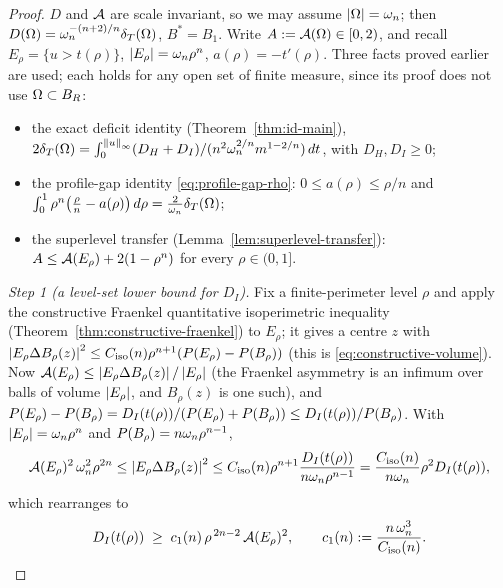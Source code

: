 \begin{proof}
$D$ and $\mathcal A$ are scale invariant, so we may assume $\left|\Omega\right|=\omega_n$; then
$D(\Omega)=\omega_n^{-(n+2)/n}\delta_T(\Omega)$, $B^*=B_1$. Write $A:=\mathcal A(\Omega)\in[0,2)$,
and recall $E_\rho=\{u>t(\rho)\}$, $\left|E_\rho\right|=\omega_n\rho^n$,
$a(\rho)=-t'(\rho)$. Three facts proved earlier are used; each holds for any
open set of finite measure, since its proof does not use $\Omega\subset B_R$:
\begin{itemize}
\item[(a)] the exact deficit identity (Theorem~\ref{thm:id-main}),
$2\delta_T(\Omega)=\int_0^{\left\|u\right\|_\infty}(D_H+D_I)/(n^2\omega_n^{2/n}m^{1-2/n})\,dt$,
with $D_H,D_I\ge0$;
\item[(b)] the profile-gap identity \eqref{eq:profile-gap-rho}:
$0\le a(\rho)\le\rho/n$ and
$\int_0^1\rho^n\bigl(\tfrac\rho n-a(\rho)\bigr)\,d\rho=\tfrac2{\omega_n}\delta_T(\Omega)$;
\item[(c)] the superlevel transfer (Lemma~\ref{lem:superlevel-transfer}):
$A\le\mathcal A(E_\rho)+2(1-\rho^n)$ for every $\rho\in(0,1]$.
\end{itemize}

\emph{Step 1 (a level-set lower bound for $D_I$).}
Fix a finite-perimeter level $\rho$ and apply the constructive Fraenkel
quantitative isoperimetric inequality (Theorem~\ref{thm:constructive-fraenkel})
to $E_\rho$; it gives a centre $z$ with
$\left|E_\rho\Delta B_\rho(z)\right|^2\le C_{\rm iso}(n)\rho^{n+1}
(P(E_\rho)-P(B_\rho))$ (this is \eqref{eq:constructive-volume}).
Now $\mathcal A(E_\rho)\le\left|E_\rho\Delta B_\rho(z)\right|/\left|E_\rho\right|$ (the Fraenkel
asymmetry is an infimum over balls of volume $\left|E_\rho\right|$, and $B_\rho(z)$
is one such), and
$P(E_\rho)-P(B_\rho)=D_I(t(\rho))/(P(E_\rho)+P(B_\rho))\le
D_I(t(\rho))/P(B_\rho)$. With $\left|E_\rho\right|=\omega_n\rho^n$ and
$P(B_\rho)=n\omega_n\rho^{n-1}$,
\[
   \mathcal A(E_\rho)^2\,\omega_n^2\rho^{2n}\le\left|E_\rho\Delta B_\rho(z)\right|^2
   \le C_{\rm iso}(n)\rho^{n+1}\frac{D_I(t(\rho))}{n\omega_n\rho^{n-1}}
   =\frac{C_{\rm iso}(n)}{n\omega_n}\rho^2 D_I(t(\rho)),
\]
which rearranges to
\begin{equation}\label{eq:seed-FJ}
   D_I(t(\rho))\;\ge\;c_1(n)\,\rho^{\,2n-2}\,\mathcal A(E_\rho)^2,
   \qquad c_1(n):=\frac{n\,\omega_n^{3}}{C_{\rm iso}(n)} .
\end{equation}


\end{proof}
